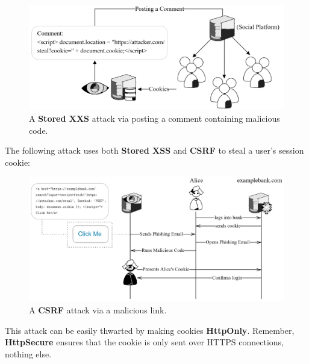 \begin{figure}[h!]
    \centering
    \includegraphics[width=.9\textwidth]{Sections/attk/cookie.png}
    \caption{A \textbf{Stored XXS} attack via posting a comment containing malicious code.}
    \label{fig:cookies}
\end{figure}

\newpage 

\noindent
The following attack uses both \textbf{Stored XSS} and \textbf{CSRF} to steal a user's session cookie:\\

\vspace{1em}


\begin{figure}[h!]
    \centering
    \hspace{-3em}
    \includegraphics[width=1\textwidth]{Sections/attk/both.png}
    \caption{A \textbf{CSRF} attack via a malicious link.}
    \label{fig:csrf}
\end{figure}

\noindent
This attack can be easily thwarted by making cookies \textbf{HttpOnly}. Remember, \textbf{HttpSecure}
ensures that the cookie is only sent over HTTPS connections, nothing else.

